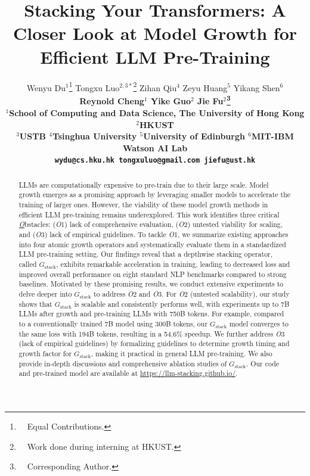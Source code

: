 \documentclass{article}
\title{Stacking Your Transformers: A Closer Look at Model Growth for Efficient LLM Pre-Training}
\begin{document}
\author{
Wenyu Du$^1$\thanks{~~Equal Contributions.}
\quad Tongxu Luo$^{2,3*}$\thanks{~~Work done during interning at HKUST.}
\quad Zihan Qiu$^4$
\quad Zeyu Huang$^5$
\quad Yikang Shen$^6$ \\
\bf{
Reynold Cheng$^1$
\quad Yike Guo$^2$
\quad Jie Fu$^2$\thanks{~~Corresponding Author.}}\\
$^1$School of Computing and Data Science, The University of Hong Kong \quad $^2$HKUST \\
$^3$USTB \quad $^4$Tsinghua University \quad $^5$University of Edinburgh \quad $^6$MIT-IBM Watson AI Lab\\
\texttt{wydu@cs.hku.hk \quad tongxuluo@gmail.com \quad  jiefu@ust.hk}
}

\maketitle

\begin{abstract}

LLMs are computationally expensive to pre-train due to their large scale.
Model growth emerges as a promising approach by leveraging smaller models to accelerate the training of larger ones. 
However, the viability of these model growth methods in efficient LLM pre-training remains underexplored.
This work identifies three critical \underline{\textit{O}}bstacles: (\textit{O}1) lack of comprehensive evaluation, (\textit{O}2) untested viability for scaling, and (\textit{O}3) lack of empirical guidelines.
To tackle \textit{O}1, we summarize existing approaches into four atomic growth operators and systematically evaluate them in a standardized LLM pre-training setting.
Our findings reveal that a depthwise stacking operator, called $G_{\text{stack}}$, exhibits remarkable acceleration in training, leading to decreased loss and improved overall performance on eight standard NLP benchmarks compared to strong baselines. 
Motivated by these promising results, we conduct extensive experiments to delve deeper into $G_{\text{stack}}$ to address \textit{O}2 and \textit{O}3.
For \textit{O}2 (untested scalability), our study shows that $G_{\text{stack}}$ is scalable and consistently performs well, with experiments up to 7B LLMs after growth and pre-training LLMs with 750B tokens.
For example, compared to a conventionally trained 7B model using 300B tokens, our $G_{\text{stack}}$ model converges to the same loss with 194B tokens, resulting in a 54.6\% speedup. 
We further address \textit{O}3 (lack of empirical guidelines) by formalizing guidelines to determine growth timing and growth factor for $G_{\text{stack}}$, making it practical in general LLM pre-training.
We also provide in-depth discussions and comprehensive ablation studies of $G_{\text{stack}}$.
Our code and pre-trained model are available at \href{https://llm-stacking.github.io/}{https://llm-stacking.github.io/}.


\end{abstract}
\end{document}

